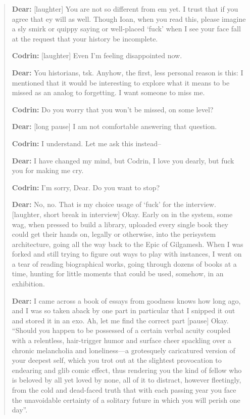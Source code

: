 \begin{quote}
\textbf{Dear:} {[}laughter{]} You are not so different from em yet. I trust that if you agree that ey will as well. Though Ioan, when you read this, please imagine a sly smirk or quippy saying or well-placed `fuck' when I see your face fall at the request that your history be incomplete.

\textbf{Codrin:} {[}laughter{]} Even I'm feeling disappointed now.

\textbf{Dear:} You historians, tsk. Anyhow, the first, less personal reason is this: I mentioned that it would be interesting to explore what it means to be missed as an analog to forgetting. I want someone to miss me.

\textbf{Codrin:} Do you worry that you won't be missed, on some level?

\textbf{Dear:} {[}long pause{]} I am not comfortable answering that question.

\textbf{Codrin:} I understand. Let me ask this instead--

\textbf{Dear:} I have changed my mind, but Codrin, I love you dearly, but fuck you for making me cry.

\textbf{Codrin:} I'm sorry, Dear. Do you want to stop?

\textbf{Dear:} No, no. That is my choice usage of `fuck' for the interview. {[}laughter, short break in interview{]} Okay. Early on in the system, some wag, when pressed to build a library, uploaded every single book they could get their hands on, legally or otherwise, into the perisystem architecture, going all the way back to the Epic of Gilgamesh. When I was forked and still trying to figure out ways to play with instances, I went on a tear of reading biographical works, going through dozens of books at a time, hunting for little moments that could be used, somehow, in an exhibition.

\textbf{Dear:} I came across a book of essays from goodness knows how long ago, and I was so taken aback by one part in particular that I snipped it out and stored it in an exo. Ah, let me find the correct part {[}pause{]} Okay. ``Should you happen to be possessed of a certain verbal acuity coupled with a relentless, hair-trigger humor and surface cheer spackling over a chronic melancholia and loneliness---a grotesquely caricatured version of your deepest self, which you trot out at the slightest provocation to endearing and glib comic effect, thus rendering you the kind of fellow who is beloved by all yet loved by none, all of it to distract, however fleetingly, from the cold and dead-faced truth that with each passing year you face the unavoidable certainty of a solitary future in which you will perish one day''.


\end{quote}
